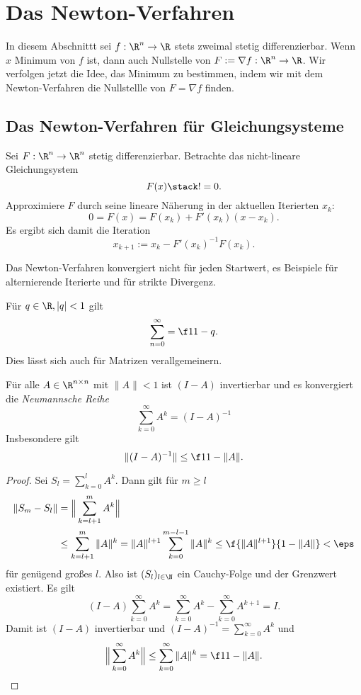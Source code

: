\section{Das Newton-Verfahren}


In diesem Abschnittt sei $f: \R^n \to \R$ stets zweimal stetig differenzierbar.
Wenn $\hat x$ Minimum von $f$ ist, dann auch Nullstelle von $F := \nabla f : \R^n \to \R$.
Wir verfolgen jetzt die Idee, das Minimum zu bestimmen, indem wir mit dem Newton-Verfahren die Nullstellle von $F = \nabla f$ finden.

\subsection{Das Newton-Verfahren für Gleichungsysteme}

Sei $F: \R^n \to \R^n$ stetig differenzierbar.
Betrachte das nicht-lineare Gleichungsystem
\[
	F(x) \stack != 0.
\]
Approximiere $F$ durch seine lineare Näherung in der aktuellen Iterierten $x_k$:
\[
	0
	= F(x)
	= F(x_k) + F'(x_k)(x-x_k).
\]
Es ergibt sich damit die Iteration
\[
	x_{k+1}
	:= x_k - F'(x_k)^{-1} F(x_k).
\]

\begin{alg} \label{alg:5}
	\begin{algorithmic}
		\EndWhile
	\end{algorithmic}
\end{alg}

Das Newton-Verfahren konvergiert nicht für jeden Startwert, es Beispiele für alternierende Iterierte und für strikte Divergenz.

Für $q \in \R, |q| < 1$ gilt
\[
	\sum_{n=0}^\infty = \f 1{1-q}.
\]
Dies lässt sich auch für Matrizen verallgemeinern.

\begin{lem} \label{2.40}
	Für alle $A \in \R^{n\times n}$ mit $\|A\| < 1$ ist $(I-A)$ invertierbar und es konvergiert die \emph{Neumannsche Reihe}
	\[
		\sum_{k=0}^\infty A^k
		= (I-A)^{-1}
	\]
	Insbesondere gilt
	\[
		\|(I-A)^{-1}\|
		\le \f 1{1-\|A\|}.
	\]
	\begin{proof}
		Sei $S_l = \sum_{k=0}^l A^k$.
		Dann gilt für $m \ge l$
		\begin{align*}
			\|S_m - S_l\|
			&= \Big\| \sum_{k=l+1}^m A^k \Big\| \\
			&\le \sum_{k=l+1}^m \|A\|^k
			= \|A\|^{l+1} \sum_{k=0}^{m-l-1} \|A\|^k
			\le \f{\|A\|^{l+1}}{1-\|A\|}
			< \eps
		\end{align*}
		für genügend großes $l$.
		Also ist $(S_l)_{l\in\N}$ ein Cauchy-Folge und der Grenzwert existiert.
		Es gilt
		\[
			(I-A) \sum_{k=0}^\infty A^k
			= \sum_{k=0}^\infty A^k - \sum_{k=0}^\infty A^{k+1}
			= I.
		\]
		Damit ist $(I-A)$ invertierbar und $(I-A)^{-1} = \sum_{k=0}^\infty A^k$ und
		\[
			\Big\| \sum_{k=0}^\infty A^k \Big\|
			\le \sum_{k=0}^\infty \|A\|^k
			= \f 1{1-\|A\|}.
		\]
	\end{proof}
\end{lem}

